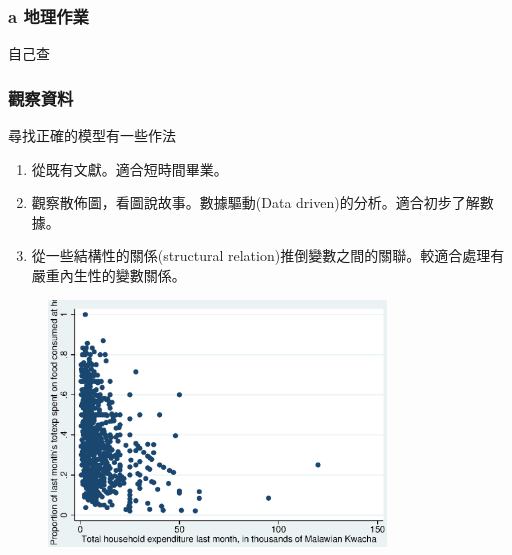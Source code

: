 \begin{frame}
    \frametitle{a 地理作業}

    自己查

\end{frame}


\begin{frame}
    \frametitle{觀察資料}
    尋找正確的模型有一些作法
    \begin{enumerate}
        \item 從既有文獻。適合短時間畢業。
        \item 觀察散佈圖，看圖說故事。數據驅動(Data driven)的分析。適合初步了解數據。
        \item 從一些結構性的關係(structural relation)推倒變數之間的關聯。較適合處理有嚴重內生性的變數關係。
    \end{enumerate}
\end{frame}

\begin{frame}[plain]
    \begin{figure}
        \includegraphics[width=0.8\textwidth]{../Results/Q4_11_simple_scatter.eps}
    \end{figure}
\end{frame}


